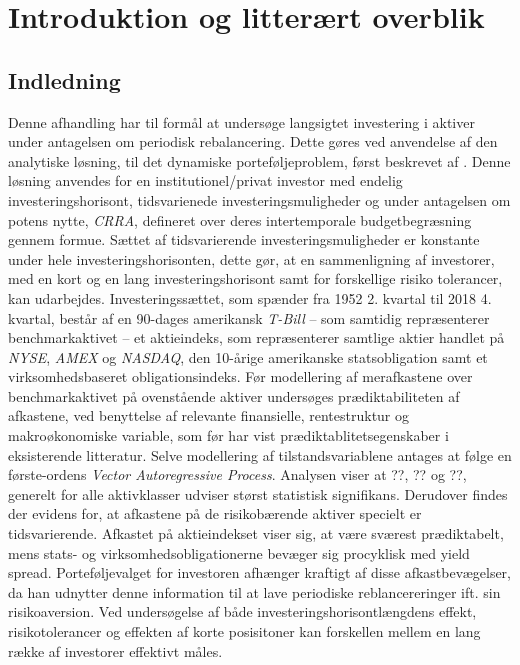 \documentclass[
  a4paper,
  oneside]{memoir}
\begin{document}
\setcounter{secnumdepth}{3}

\part{Introduktion og litterært overblik}

\hypertarget{indledning}{%
\chapter{Indledning}\label{indledning}}

Denne afhandling har til formål at undersøge langsigtet investering i aktiver under antagelsen om periodisk rebalancering. Dette gøres ved anvendelse af den analytiske løsning, til det dynamiske porteføljeproblem, først beskrevet af \citep{JurVic2011}. Denne løsning anvendes for en institutionel/privat investor med endelig investeringshorisont, tidsvarienede investeringsmuligheder og under antagelsen om potens nytte, \emph{CRRA}, defineret over deres intertemporale budgetbegræsning gennem formue. Sættet af tidsvarierende investeringsmuligheder er konstante under hele investeringshorisonten, dette gør, at en sammenligning af investorer, med en kort og en lang investeringshorisont samt for forskellige risiko tolerancer, kan udarbejdes. Investeringssættet, som spænder fra 1952 2. kvartal til 2018 4. kvartal, består af en 90-dages amerikansk \emph{T-Bill} -- som samtidig repræsenterer benchmarkaktivet -- et aktieindeks, som repræsenterer samtlige aktier handlet på \emph{NYSE}, \emph{AMEX} og \emph{NASDAQ}, den 10-årige amerikanske statsobligation samt et virksomhedsbaseret obligationsindeks. Før modellering af merafkastene over benchmarkaktivet på ovenstående aktiver undersøges prædiktabiliteten af afkastene, ved benyttelse af relevante finansielle, rentestruktur og makroøkonomiske variable, som før har vist prædiktablitetsegenskaber i eksisterende litteratur. Selve modellering af tilstandsvariablene antages at følge en første-ordens \emph{Vector Autoregressive Process}. Analysen viser at ??, ?? og ??, generelt for alle aktivklasser udviser størst statistisk signifikans. Derudover findes der evidens for, at afkastene på de risikobærende aktiver specielt er tidsvarierende. Afkastet på aktieindekset viser sig, at være sværest prædiktabelt, mens stats- og virksomhedsobligationerne bevæger sig procyklisk med yield spread. Porteføljevalget for investoren afhænger kraftigt af disse afkastbevægelser, da han udnytter denne information til at lave periodiske reblancereringer ift. sin risikoaversion. Ved undersøgelse af både investeringshorisontlængdens effekt, risikotolerancer og effekten af korte posisitoner kan forskellen mellem en lang række af investorer effektivt måles.
\end{document}
